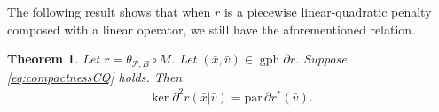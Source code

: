 \documentclass[reqno]{amsart}
\newtheorem{theorem}[proposition]{Theorem}
\numberwithin{equation}{section}
\newcommand{\tpb}{\theta_{\mathcal{P},B}}
\newcommand{\gph}{\operatorname{gph}}
\newcommand{\para}{\mathrm{par}\,}
\begin{document}


The following result shows that when $r$ is a piecewise linear-quadratic penalty composed with a linear operator, we still have the aforementioned relation.

\begin{theorem}\label{eq:kerHessPLQ}
    Let $r = \tpb \circ M$. Let $(\bar{x}, \bar{v}) \in \gph \partial r$. Suppose \eqref{eq:compactnessCQ} holds. Then
    \begin{align*}
        \ker \partial^2 r(\bar{x} | \bar{v}) = \para \partial r^* (\bar{v}).
    \end{align*}
\end{theorem}
\end{document}
